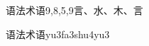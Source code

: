 \begin{entry}{语法术语}{9,8,5,9}{⾔、⽔、⽊、⾔}
  \begin{phonetics}{语法术语}{yu3fa3shu4yu3}
  \end{phonetics}
\end{entry}
